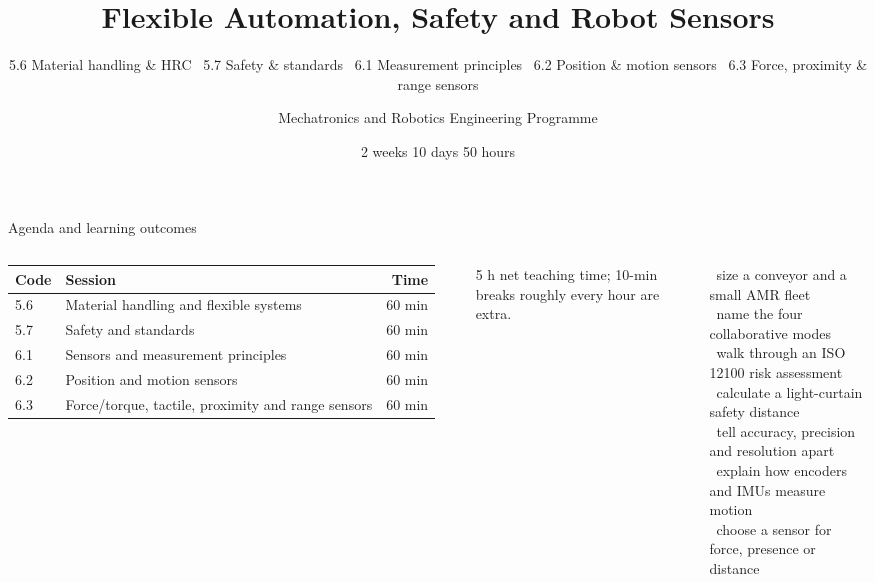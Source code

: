 \documentclass[aspectratio=169,10pt]{beamer}
\title[W2D4: Flexible Automation, Safety \& Sensors]{Flexible Automation, Safety and Robot Sensors}
\subtitle{5.6 Material handling \& HRC \textbullet\ 5.7 Safety \& standards \textbullet\ 6.1 Measurement principles \textbullet\ 6.2 Position \& motion sensors \textbullet\ 6.3 Force, proximity \& range sensors}
\author{Mechatronics and Robotics Engineering Programme}
\institute{Week 2 \textperiodcentered{} Day 4}
\date{2 weeks \textperiodcentered{} 10 days \textperiodcentered{} 50 hours}
\begin{document}
\begin{frame}[plain]\titlepage\end{frame}

\begin{frame}{Agenda and learning outcomes}
\begin{columns}[T]
\small
\renewcommand{\arraystretch}{1.15}
\begin{tabularx}{\linewidth}{@{}l X r@{}}
\toprule
\textbf{Code} & \textbf{Session} & \textbf{Time}\\
\midrule
5.6 & Material handling and flexible systems & 60 min\\
5.7 & Safety and standards & 60 min\\
6.1 & Sensors and measurement principles & 60 min\\
6.2 & Position and motion sensors & 60 min\\
6.3 & Force/torque, tactile, proximity and range sensors & 60 min\\
\bottomrule
\end{tabularx}

\vspace{2mm}
{\footnotesize\color{mkGray} 5 h net teaching time; 10-min breaks roughly every hour are extra.}
\begin{keybox}
\small
\checkitem\ size a conveyor and a small AMR fleet\\
\checkitem\ name the four collaborative modes\\
\checkitem\ walk through an ISO 12100 risk assessment\\
\checkitem\ calculate a light-curtain safety distance\\
\checkitem\ tell accuracy, precision and resolution apart\\
\checkitem\ explain how encoders and IMUs measure motion\\
\checkitem\ choose a sensor for force, presence or distance
\end{keybox}
\end{columns}
\end{frame}
\end{document}
